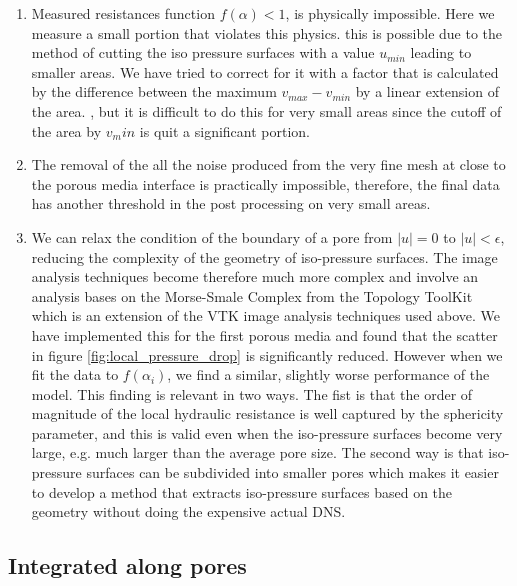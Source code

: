 \documentclass[draft]{agujournal2019}
\begin{document}
\begin{enumerate}
	\item Measured resistances function $f(\alpha) < 1$, is physically impossible. Here we measure a small portion that violates this physics. this is possible due to the method of cutting the iso pressure surfaces with a value $u_{min}$ leading to smaller areas. We have tried to correct for it with a factor that is calculated by the difference between the maximum $v_{max}-v_{min}$ by a linear extension of the area.  , but it is difficult to do this for very small areas since the cutoff of the area by $v_min$ is quit a significant portion. 
	\item The removal of the all the noise produced from the very fine mesh at close to the porous media interface is practically impossible, therefore, the final data has another threshold in the post processing on very small areas.   
	\item We can relax the condition of the boundary of a pore from $|u| = 0$ to $|u| < \epsilon$, reducing the complexity of the geometry of iso-pressure surfaces. The image analysis techniques become therefore much more complex and involve an analysis bases on the Morse-Smale Complex from the Topology ToolKit \cite{tierny_topology_2018} which is an extension of the VTK image analysis techniques used above. We have implemented this for the first porous media and found that the scatter in figure \ref{fig:local_pressure_drop} is significantly reduced. However when we fit the data to $f(\alpha_i)$, we find a similar, slightly worse performance of the model. This finding is relevant in two ways. The fist is that the order of magnitude of the local hydraulic resistance is well captured by the sphericity parameter, and this is valid even when the iso-pressure surfaces become very large, e.g. much larger than the average pore size. The second way is that iso-pressure surfaces can be subdivided into smaller pores which makes it easier to develop a method that extracts iso-pressure surfaces based on the geometry without doing the expensive actual DNS.  
\end{enumerate}


\subsection{Integrated along pores}

\begin{figure}
\label{fig:histogram_R}
\end{figure}
\end{document}

